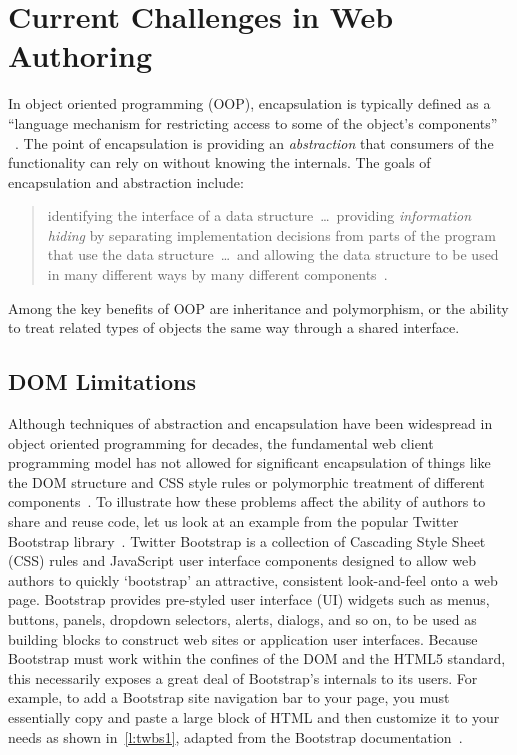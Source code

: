 \section{Current Challenges in Web Authoring}
In object oriented programming (OOP), encapsulation is typically defined as a 
``language mechanism for restricting access to some of the object's components''
~\cite[p. 522]{mitchell2003}.
The point of encapsulation is providing an \textit{abstraction} that consumers of the functionality can rely on without knowing the internals. 
The goals of encapsulation and abstraction include:
\begin{quote}
identifying the interface of a data structure~\dots~providing \textit{information hiding} by separating implementation decisions from parts of the program that use the data 
structure~\dots~and allowing the data structure to be used in many different ways by many different components~\cite[p. 243]{mitchell2003}.
\end{quote}
Among the key benefits of OOP are inheritance and polymorphism, or the ability to treat related types of objects the same way through a shared interface.

\subsection{DOM Limitations}
Although techniques of abstraction and encapsulation have been widespread in object oriented programming for decades,
the fundamental web client programming mo\-del has not allowed for significant encapsulation of things like the DOM structure and CSS style rules or polymorphic treatment of different components~\cite{ihrig2012}.
To illustrate how these problems affect the ability of authors to share and reuse code, 
let us look at an example from the popular Twitter Bootstrap library~\cite{bootstrapcontributors2015}.
Twitter Bootstrap is a collection of Cascading Style Sheet (CSS) rules and JavaScript user interface components designed to allow web authors to quickly `bootstrap' an attractive, consistent look-and-feel onto a web page.
Bootstrap provides pre-styled user interface (UI) widgets such as menus, buttons, panels, dropdown selectors, alerts, dialogs, and so on, to be used as building blocks to construct web sites or application user interfaces.
Because Bootstrap must work within the confines of the DOM and the HTML5 standard, this necessarily exposes a great deal of Bootstrap's internals to its users.
For example, to add a Bootstrap site navigation bar to your page, you must essentially copy and paste a large block of HTML and then customize it to your needs as shown in~\cref{l:twbs1}, adapted from the Bootstrap documentation~\cite{bootstrapcontributors2015}.

